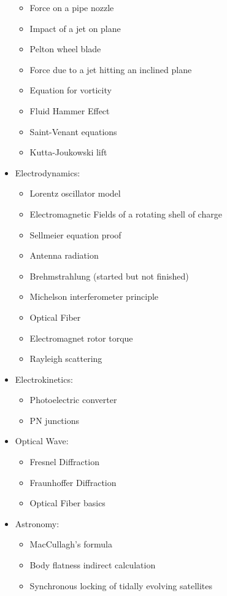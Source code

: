 \begin{itemize}
\begin{itemize}
				\item Force on a pipe nozzle
				\item Impact of a jet on plane
				\item Pelton wheel blade
				\item Force due to a jet hitting an inclined plane
				\item Equation for vorticity
				\item Fluid Hammer Effect
				\item Saint-Venant equations
				\item Kutta-Joukowski lift
			\end{itemize}	
		\item Electrodynamics:
			\begin{itemize}		
				\item Lorentz oscillator model
				\item Electromagnetic Fields of a rotating shell of charge
				\item Sellmeier equation proof
				\item Antenna radiation
				\item Brehmstrahlung (started but not finished)
				\item Michelson interferometer principle
				\item Optical Fiber
				\item Electromagnet rotor torque
				\item Rayleigh scattering
			\end{itemize}
		\item Electrokinetics:
			\begin{itemize}		
				\item Photoelectric converter
				\item PN junctions
			\end{itemize}
		\item Optical Wave:
			\begin{itemize}		
				\item Fresnel Diffraction
				\item Fraunhoffer Diffraction
				\item Optical Fiber basics
			\end{itemize}
		\item Astronomy:
			\begin{itemize}	
				\item MacCullagh's formula
				\item Body flatness indirect calculation
				\item Synchronous locking of tidally evolving satellites		

\end{itemize}
\end{itemize}
